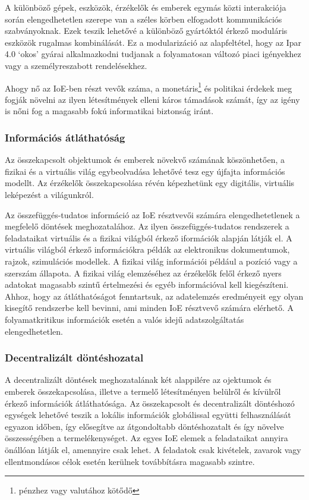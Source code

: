 \documentclass[../documentation.tex]{subfiles}
\begin{document}
A különböző gépek, eszközök, érzékelők és emberek egymás közti interakciója során elengedhetetlen szerepe van a széles körben elfogadott kommunikációs szabványoknak. Ezek teszik lehetővé a különböző gyártóktól érkező moduláris eszközök rugalmas kombinálását. Ez a modularizáció az alapfeltétel, hogy az Ipar 4.0 `okos' gyárai alkalmazkodni tudjanak a folyamatosan változó piaci igényekhez vagy a személyreszabott rendelésekhez.

Ahogy nő az IoE-ben részt vevők száma, a monetáris\footnote{pénzhez vagy valutához kötődő} és politikai érdekek meg fogják növelni az ilyen létesítmények elleni káros támadások számát, így az igény is nőni fog a magasabb fokú informatikai biztonság iránt.

\subsubsection{Információs átláthatóság}
Az összekapcsolt objektumok és emberek növekvő számának köszönhetően, a fizikai és a virtuális világ egybeolvadása lehetővé tesz egy újfajta információs modellt\cite{newinformation}. Az érzékelők összekapcsolása révén képezhetünk egy digitális, virtuális leképezést a világunkról.

Az összefüggés-tudatos információ az IoE résztvevői számára elengedhetetlenek a megfelelő döntések meghozatalához. Az ilyen összefüggés-tudatos rendszerek a feladataikat virtuális és a fizikai világból érkező iformációk alapján látják el. A virtuális világból érkező információkra példák az elektronikus dokumentumok, rajzok, szimulációs modellek. A fizikai világ információi például a pozíció vagy a szerszám állapota. A fizikai világ elemzéséhez az érzékelők felől érkező nyers adatokat magasabb szintű értelmezési és egyéb információval kell kiegészíteni. Ahhoz, hogy az átláthatóságot fenntartsuk, az adatelemzés eredményeit egy olyan kisegítő rendszerbe kell bevinni, ami minden IoE résztvevő számára elérhető. A folyamatkritikus információk esetén a valós idejű adatszolgáltatás elengedhetetlen.

\subsubsection{Decentralizált döntéshozatal}
A decentralizált döntések meghozatalának két alappilére az ojektumok és emberek összekapcsolása, illetve a termelő létesítményen belülről és kívülről érkező információk átláthatósága. Az összekapcsolt és decentralizált döntéshozó egységek lehetővé teszik a lokális információk globálissal együtti felhasználását egyazon időben, így elősegítve az átgondoltabb döntéshozatalt és így növelve összességében a termelékenységet. Az egyes IoE elemek a feladataikat annyira önállóan látják el, amennyire csak lehet. A feladatok csak kivételek, zavarok vagy ellentmondásos célok esetén kerülnek továbbításra magasabb szintre.
\end{document}

